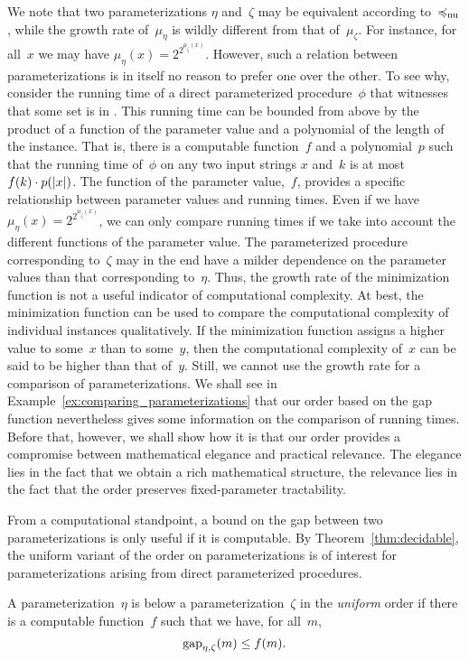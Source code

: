 We note that two parameterizations $\eta$ and~$\zeta$ may be equivalent according to~$\preccurlyeq_\mathrm{nu}$, while the growth rate of~$\mu_\eta$ is wildly different from that of~$\mu_\zeta$.
For instance, for all~$x$ we may have $\mu_\eta(x) = 2^{2^{\mu_\zeta(x)}}$.
However, such a relation between parameterizations is in itself no reason to prefer one over the other.
To see why, consider the running time of a direct parameterized procedure~$\phi$ that witnesses that some set is in .
This running time can be bounded from above by the product of a function of the parameter value and a polynomial of the length of the instance.
That is, there is a computable function~$f$ and a polynomial~$p$ such that the running time of~$\phi$ on any two input strings $x$ and~$k$ is at most $f(k) \cdot p({\lvert x\rvert})$.
The function of the parameter value,~$f$, provides a specific relationship between parameter values and running times.
Even if we have $\mu_\eta(x) = 2^{2^{\mu_\zeta(x)}}$, we can only compare running times if we take into account the different functions of the parameter value.
The parameterized procedure corresponding to~$\zeta$ may in the end have a milder dependence on the parameter values than that corresponding to~$\eta$.
Thus, the growth rate of the minimization function is not a useful indicator of computational complexity.
At best, the minimization function can be used to compare the computational complexity of individual instances qualitatively.
If the minimization function assigns a higher value to some~$x$ than to some~$y$, then the computational complexity of~$x$ can be said to be higher than that of~$y$.
Still, we cannot use the growth rate for a comparison of parameterizations.
We shall see in Example~\ref{ex:comparing_parameterizations} that our order based on the gap function nevertheless gives some information on the comparison of running times.
Before that, however, we shall show how it is that our order provides a compromise between mathematical elegance and practical relevance.
The elegance lies in the fact that we obtain a rich mathematical structure, the relevance lies in the fact that the order preserves fixed-parameter tractability.

From a computational standpoint, a bound on the gap between two parameterizations is only useful if it is computable.
By Theorem~\ref{thm:decidable}, the uniform variant of the order on parameterizations is of interest for parameterizations arising from direct parameterized procedures.

\begin{definition}
\label{def:uniform_order}%
  A parameterization~$\eta$ is below a parameterization~$\zeta$ in the \emph{uniform} order  if there is a computable function~$f$ such that we have, for all~$m$,
  \begin{equation*}
    \operatorname{gap}_{\eta, \zeta}(m) \le f(m).
  \end{equation*}
\end{definition}

